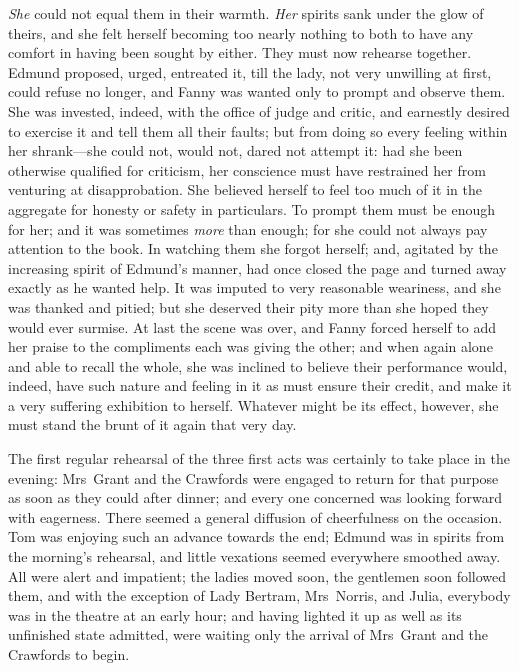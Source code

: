 \textit{She}  could not equal them in their warmth. \textit{Her}  spirits sank under the glow of theirs, and she felt herself becoming too nearly nothing to both to have any comfort in having been sought by either. They must now rehearse together. Edmund proposed, urged, entreated it, till the lady, not very unwilling at first, could refuse no longer, and Fanny was wanted only to prompt and observe them. She was invested, indeed, with the office of judge and critic, and earnestly desired to exercise it and tell them all their faults; but from doing so every feeling within her shrank—she could not, would not, dared not attempt it: had she been otherwise qualified for criticism, her conscience must have restrained her from venturing at disapprobation. She believed herself to feel too much of it in the aggregate for honesty or safety in particulars. To prompt them must be enough for her; and it was sometimes \textit{more}  than enough; for she could not always pay attention to the book. In watching them she forgot herself; and, agitated by the increasing spirit of Edmund's manner, had once closed the page and turned away exactly as he wanted help. It was imputed to very reasonable weariness, and she was thanked and pitied; but she deserved their pity more than she hoped they would ever surmise. At last the scene was over, and Fanny forced herself to add her praise to the compliments each was giving the other; and when again alone and able to recall the whole, she was inclined to believe their performance would, indeed, have such nature and feeling in it as must ensure their credit, and make it a very suffering exhibition to herself. Whatever might be its effect, however, she must stand the brunt of it again that very day.

The first regular rehearsal of the three first acts was certainly to take place in the evening: Mrs~Grant and the Crawfords were engaged to return for that purpose as soon as they could after dinner; and every one concerned was looking forward with eagerness. There seemed a general diffusion of cheerfulness on the occasion. Tom was enjoying such an advance towards the end; Edmund was in spirits from the morning's rehearsal, and little vexations seemed everywhere smoothed away. All were alert and impatient; the ladies moved soon, the gentlemen soon followed them, and with the exception of Lady Bertram, Mrs~Norris, and Julia, everybody was in the theatre at an early hour; and having lighted it up as well as its unfinished state admitted, were waiting only the arrival of Mrs~Grant and the Crawfords to begin.

